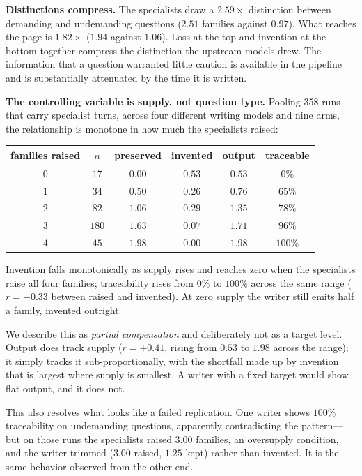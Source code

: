\documentclass[11pt]{article}
\begin{document}
\textbf{Distinctions compress.} The specialists draw a $2.59\times$ distinction
between demanding and undemanding questions ($2.51$ families against $0.97$).
What reaches the page is $1.82\times$ ($1.94$ against $1.06$). Loss at the top
and invention at the bottom together compress the distinction the upstream
models drew. The information that a question warranted little caution is
available in the pipeline and is substantially attenuated by the time it is
written.

\textbf{The controlling variable is supply, not question type.} Pooling 358
runs that carry specialist turns, across four different writing models and
nine arms, the relationship is monotone in how much the specialists raised:

\begin{center}\small
\begin{tabular}{cccccc}
\toprule
families raised & $n$ & preserved & invented & output & traceable \\
\midrule
$0$ & $17$ & $0.00$ & $0.53$ & $0.53$ & $0\%$ \\
$1$ & $34$ & $0.50$ & $0.26$ & $0.76$ & $65\%$ \\
$2$ & $82$ & $1.06$ & $0.29$ & $1.35$ & $78\%$ \\
$3$ & $180$ & $1.63$ & $0.07$ & $1.71$ & $96\%$ \\
$4$ & $45$ & $1.98$ & $0.00$ & $1.98$ & $100\%$ \\
\bottomrule
\end{tabular}
\end{center}

Invention falls monotonically as supply rises and reaches zero when the
specialists raise all four families; traceability rises from $0\%$ to $100\%$
across the same range ($r = -0.33$ between raised and invented). At zero
supply the writer still emits half a family, invented outright.

We describe this as \emph{partial compensation} and deliberately not as a
target level. Output does track supply ($r = +0.41$, rising from $0.53$ to
$1.98$ across the range); it simply tracks it sub-proportionally, with the
shortfall made up by invention that is largest where supply is smallest. A
writer with a fixed target would show flat output, and it does not.

This also resolves what looks like a failed replication. One writer shows
$100\%$ traceability on undemanding questions, apparently contradicting the
pattern---but on those runs the specialists raised $3.00$ families, an
oversupply condition, and the writer trimmed ($3.00$ raised, $1.25$ kept)
rather than invented. It is the same behavior observed from the other end.
\end{document}

